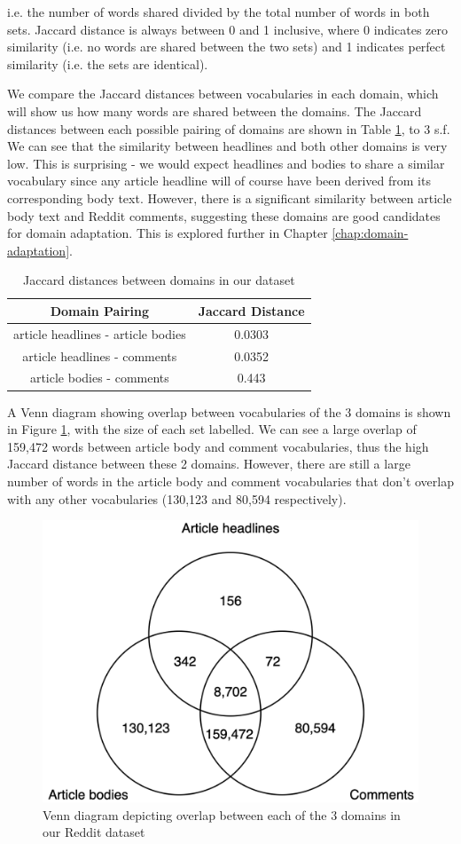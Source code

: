 i.e. the number of words shared divided by the total number of words in both sets. Jaccard distance is always between 0 and 1 inclusive, where 0 indicates zero similarity (i.e. no words are shared between the two sets) and 1 indicates perfect similarity (i.e. the sets are identical).

We compare the Jaccard distances between vocabularies in each domain, which will show us how many words are shared between the domains. The Jaccard distances between each possible pairing of domains are shown in Table \ref{tab:jaccard-distances}, to 3 s.f. We can see that the similarity between headlines and both other domains is very low. This is surprising - we would expect headlines and bodies to share a similar vocabulary since any article headline will of course have been derived from its corresponding body text. However, there is a significant similarity between article body text and Reddit comments, suggesting these domains are good candidates for domain adaptation. This is explored further in Chapter \ref{chap:domain-adaptation}.

\begin{table}[ht]
    \centering
    \begin{tabular}{|c|c|}
        \hline
        \textbf{Domain Pairing} & \textbf{Jaccard Distance} \\
        \hline
        article headlines - article bodies & 0.0303 \\
        article headlines - comments & 0.0352 \\
        article bodies - comments & 0.443 \\
        \hline
    \end{tabular}
    \caption{Jaccard distances between domains in our dataset}
    \label{tab:jaccard-distances}
\end{table}

A Venn diagram showing overlap between vocabularies of the 3 domains is shown in Figure \ref{fig:vocab-venn-diagram}, with the size of each set labelled. We can see a large overlap of 159,472 words between article body and comment vocabularies, thus the high Jaccard distance between these 2 domains. However, there are still a large number of words in the article body and comment vocabularies that don't overlap with any other vocabularies (130,123 and 80,594 respectively).

\begin{figure}[ht]
    \centering
    \includegraphics[scale=0.23]{0-img/vocab-venn-diagram.png}
    \caption{Venn diagram depicting overlap between each of the 3 domains in our Reddit dataset}
    \label{fig:vocab-venn-diagram}
\end{figure}